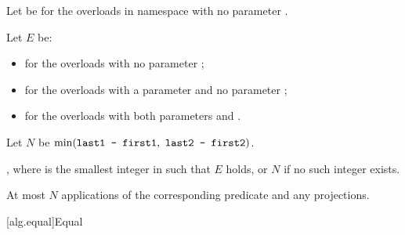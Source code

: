 \begin{itemdescr}
\pnum
Let  be 
for the overloads in namespace  with no parameter .

\pnum
Let $E$ be:
\begin{itemize}
\setlength{\emergencystretch}{1em}
\item
  for the overloads with no parameter ;
\item
  for the overloads with a parameter  and
  no parameter ;
\item
  for the overloads with both parameters  and .
\end{itemize}

\pnum
Let $N$ be $\min(\tcode{last1 - first1}, \ \tcode{last2 - first2})$.

\pnum
\returns
{},
where  is the smallest integer in  such that $E$ holds,
or $N$ if no such integer exists.

\pnum
\complexity
At most $N$ applications of the corresponding predicate and any projections.
\end{itemdescr}

[alg.equal]{Equal}

